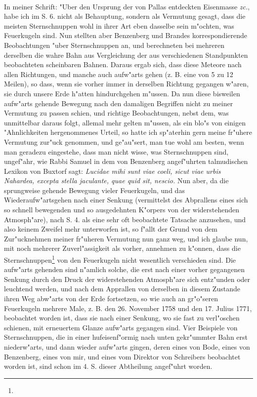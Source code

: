 \documentclass[a4paper, 11pt, oneside, polutonikogreek, german]{article}
\begin{document}
\paragraph{}
In meiner Schrift: "Uber den Ursprung der von Pallas entdeckten Eisenmasse \emph{zc.}, habe ich im S. 6. nicht als Behauptung, sondern als Vermutung gesagt, dass die meisten Sternschnuppen wohl in ihrer Art eben dasselbe sein m"ochten, was Feuerkugeln sind. Nun stellten aber Benzenberg und Brandes korrespondierende Beobachtungen "uber Sternschnuppen an, und berechneten bei mehreren derselben die wahre Bahn aus Vergleichung der aus verschiedenen Standpunkten beobachteten scheinbaren Bahnen. Daraus ergab sich, dass diese Meteore nach allen Richtungen, und manche auch aufw"arts gehen (z. B. eine von 5 zu 12 Meilen), so dass, wenn sie vorher immer in derselben Richtung gegangen w"aren, sie durch unsere Erde h"atten hindurchgehen m"ussen. Da nun diese bisweilen aufw"arts gehende Bewegung nach den damaligen Begriffen nicht zu meiner Vermutung zu passen schien, und richtige Beobachtungen, nebst dem, was unmittelbar daraus folgt, allemal mehr gelten m"ussen, als ein blo"s von einigen "Ahnlichkeiten hergenommenes Urteil, so hatte ich sp"aterhin gern meine fr"uhere Vermutung zur"uck genommen, und ge"au"sert, man tue wohl am besten, wenn man geradezu eingestehe, dass man nicht wisse, was Sternschnuppen sind, ungef"ahr, wie Rabbi Samuel in dem von Benzenberg angef"uhrten talmudischen Lexikon von Buxtorf sagt: \emph{Lucidae mihi sunt viae coeli, sicut viae urbis Nahardea, excepta stella jaculante, quae quid sit, nescio.} Nun aber, da die sprungweise gehende Bewegung vieler Feuerkugeln, und das Wiederaufw"artsgehen nach einer Senkung (vermittelst des Abprallens eines sich so schnell bewegenden und so ausgedehnten K"orpers von der widerstehenden Atmosph"are), nach S. 4. als eine sehr oft beobachtete Tatsache anzusehen, und also keinem Zweifel mehr unterworfen ist, so f"allt der Grund von dem Zur"ucknehmen meiner fr"uheren Vermutung nun ganz weg, und ich glaube nun, mit noch mehrerer Zuverl"assigkeit als vorher, annehmen zu k"onnen, dass die Sternschnuppen\footnote{} von den Feuerkugeln nicht wesentlich verschieden sind. Die aufw"arts gehenden sind n"amlich solche, die erst nach einer vorher gegangenen Senkung durch den Druck der widerstehenden Atmosph"are sich entz"unden oder leuchtend werden, und nach dem Apprallen von derselben in diesem Zustande ihren Weg abw"arts von der Erde fortsetzen, so wie auch an gr"o"seren Feuerkugeln mehrere Male, z. B. den 26. November 1758 und den 17. Julius 1771, beobachtet worden ist, dass sie nach einer Senkung, wo sie fast zu verl"oschen schienen, mit erneuertem Glanze aufw"arts gegangen sind. Vier Beispiele von Sternschnuppen, die in einer hufeisenf"ormig nach unten gekr"ummter Bahn erst niederw"arts, und dann wieder aufw"arts gingen, deren eines von Bode, eines von Benzenberg, eines von mir, und eines vom Direktor von Schreibers beobachtet worden ist, sind schon im 4. S. dieser Abtheilung angef"uhrt worden.
\end{document}

